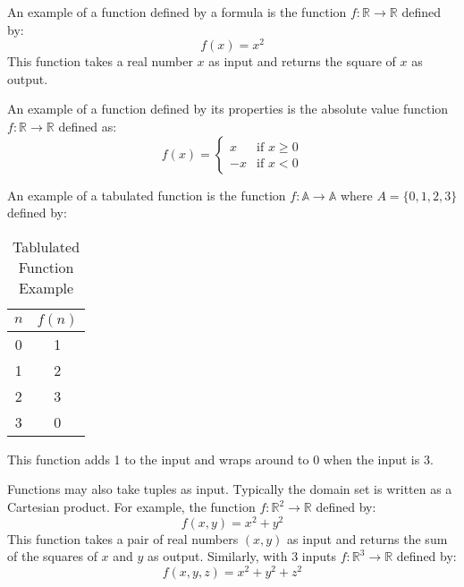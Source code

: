 An example of a function defined by a formula is the function \( f: \mathbb{R} \to \mathbb{R} \) 
defined by:
\[
  f(x) = x^2
\]
\noindent This function takes a real number \( x \) as input and returns the square of \( x \) as 
output. 

An example of a function defined by its properties is the absolute value function 
\( f: \mathbb{R} \to \mathbb{R} \) defined as:
\[
  f(x) = \begin{cases}
    x & \text{if } x \geq 0 \\
    -x & \text{if } x < 0
  \end{cases}
\]
  
An example of a tabulated function is the function \( f: \mathbb{A} \to \mathbb{A} \) 
where \( A = \{ 0, 1, 2, 3 \}\) defined by:
\begin{table}[H]
  \centering
  \begin{tabular}{cc}
    \toprule
    \textbf{\(n\)} & \textbf{\(f(n)\)} \\
    \midrule
    0 & 1 \\
    1 & 2 \\
    2 & 3 \\
    3 & 0 \\
    \bottomrule
  \end{tabular}
  \caption{Tablulated Function Example}
\end{table}
\noindent This function adds 1 to the input and wraps around to 0 when the input is 3.

Functions may also take tuples as input. Typically the domain set is written as a Cartesian 
product. For example, the function \( f: \mathbb{R}^2 \to \mathbb{R} \) defined by:
\[
  f(x, y) = x^2 + y^2
\]
\noindent This function takes a pair of real numbers \( (x, y) \) as input and returns the sum of 
the squares of \( x \) and \( y \) as output. Similarly, with 3 inputs \( f: \mathbb{R}^3 \to 
\mathbb{R} \) defined by:
\[
  f(x, y, z) = x^2 + y^2 + z^2
\]

